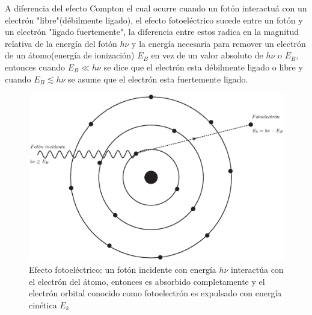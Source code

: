 A diferencia del efecto Compton el cual ocurre cuando un fotón interactuá con un electrón "libre"(débilmente ligado), el efecto fotoeléctrico sucede entre un fotón y un electrón "ligado fuertemente", la diferencia entre estos radica en la magnitud relativa de la energía del fotón $h\nu$ y la energía necesaria para remover un electrón de un átomo(energía de ionización) $E_B$ en vez de un valor absoluto de $h\nu$ o $E_B$, entonces cuando $E_B\ll h\nu$ se dice que el electrón esta débilmente ligado o libre y cuando  $E_B \lesssim h\nu$ se asume que el electrón esta fuertemente ligado\cite{Podgorsak}.


\begin{figure}[htbp]
    \centering
    \includegraphics[width=.71\linewidth]{./Figures/fotoelec.eps}
    \caption[Efecto fotoeléctrico]{Efecto fotoeléctrico: un fotón incidente con energía $h\nu$ interactúa con el electrón del átomo, entonces es absorbido completamente y el electrón orbital conocido como fotoelectrón es expulsado con energía cinética $E_k$}
    \label{fig:FT}
\end{figure}

